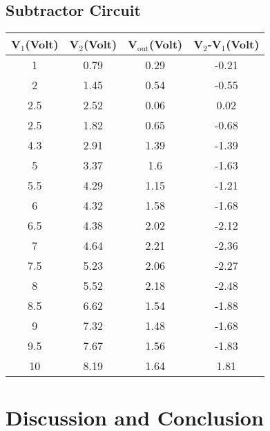\documentclass[12pt]{article}
\begin{document}
\subsection{Subtractor Circuit}
\begin{table}[H]
	\centering
	\begin{tabular}{|c|c|c|c|}
		\hline
		V$_1$(Volt) & V$_2$(Volt) & V$_\mathrm{out}$(Volt) & V$_2$-V$_1$(Volt) \\ \hline \hline
		1                    & 0.79                 & 0.29                   & -0.21                       \\ \hline
		2                    & 1.45                 & 0.54                   & -0.55                       \\ \hline
		2.5                  & 2.52                 & 0.06                   & 0.02                        \\ \hline
		2.5                  & 1.82                 & 0.65                   & -0.68                       \\ \hline
		4.3                  & 2.91                 & 1.39                   & -1.39                       \\ \hline
		5                    & 3.37                 & 1.6                    & -1.63                       \\ \hline
		5.5                  & 4.29                 & 1.15                   & -1.21                       \\ \hline
		6                    & 4.32                 & 1.58                   & -1.68                       \\ \hline
		6.5                  & 4.38                 & 2.02                   & -2.12                       \\ \hline
		7                    & 4.64                 & 2.21                   & -2.36                       \\ \hline
		7.5                  & 5.23                 & 2.06                   & -2.27                       \\ \hline
		8                    & 5.52                 & 2.18                   & -2.48                       \\ \hline
		8.5                  & 6.62                 & 1.54                   & -1.88                       \\ \hline
		9                    & 7.32                 & 1.48                   & -1.68                       \\ \hline
		9.5                  & 7.67                 & 1.56                   & -1.83                       \\ \hline
		10                   & 8.19                 & 1.64                   & 1.81                        \\ \hline
	\end{tabular}
\end{table}
\section{Discussion and Conclusion}
\end{document}
